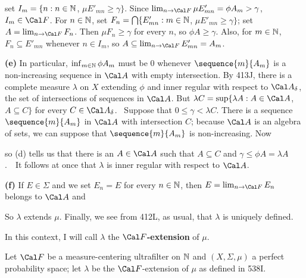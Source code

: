 {

\noindent set $I_m=\{n:n\in\Bbb N$, $\mu E'_{mn}\ge\gamma\}$.  Since
$\lim_{n\to\Cal F}\mu E'_{mn}=\phi A_m>\gamma$, $I_m\in\Cal F$.
For $n\in\Bbb N$, set
$F_n=\bigcap\{E'_{mn}:m\in\Bbb N$, $\mu E'_{mn}\ge\gamma\}$;
set $A=\lim_{n\to\Cal F}F_n$.   Then $\mu F_n\ge\gamma$ for every $n$,
so $\phi A\ge\gamma$.   Also, for $m\in\Bbb N$,
$F_n\subseteq E'_{mn}$ whenever $n\in I_m$, so
$A\subseteq\lim_{n\to\Cal F}E'_{mn}=A_m$.\ \Qed

\medskip

{\bf (e)} In particular, $\inf_{m\in\Bbb N}\phi A_m$ must be $0$ whenever
$\sequence{m}{A_m}$ is a non-increasing sequence in $\Cal A$ with empty
intersection.   By 413J, there is a complete measure $\lambda$ on $X$
extending $\phi$ and inner regular with respect to $\Cal A_{\delta}$, the
set of intersections of sequences in $\Cal A$.   But
$\lambda C=\sup\{\lambda A:A\in\Cal A$, $A\subseteq C\}$ for every
$C\in\Cal A_{\delta}$.   \Prf\ Suppose that $0\le\gamma<\lambda C$.
There is a sequence $\sequence{m}{A_m}$ in
$\Cal A$ with intersection $C$;  because $\Cal A$ is an algebra of sets, we
can suppose that $\sequence{m}{A_m}$ is non-increasing.   Now


\noindent so (d) tells us that there is an $A\in\Cal A$ such that
$A\subseteq C$ and $\gamma\le\phi A=\lambda A$.\ \QeD\  It follows at once
that $\lambda$ is inner regular with respect to $\Cal A$.

\medskip

{\bf (f)} If $E\in\Sigma$ and we set $E_n=E$ for every $n\in\Bbb N$, then
$E=\lim_{n\to\Cal F}E_n$ belongs to $\Cal A$ and


\noindent So $\lambda$ extends $\mu$.   Finally, we see from 412L, as
usual, that $\lambda$ is uniquely defined.
}%

\medskip

 In this context, I will call $\lambda$ the
{\bf $\Cal F$-extension} of $\mu$.

 Let $\Cal F$ be a measure-centering ultrafilter
on $\Bbb N$ and $(X,\Sigma,\mu)$ a
perfect probability space;  let $\lambda$ be the
$\Cal F$-extension of $\mu$ as defined in 538I.

